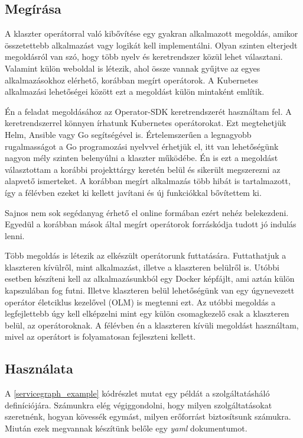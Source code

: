\subsection{Megírása}
A klaszter operátorral való kibővítése egy gyakran alkalmazott megoldás, amikor összetettebb alkalmazást vagy logikát kell implementálni. Olyan szinten elterjedt megoldásról van szó, hogy több nyelv és keretrendszer közül lehet választani. Valamint külön weboldal is létezik, ahol össze vannak gyűjtve az egyes alkalmazásokhoz elérhető, korábban megírt operátorok.\citep{operatorhub} A Kubernetes alkalmazási lehetőségei között ezt a megoldást külön mintaként említik.\citep{KubernetesPatterns} 

Én a feladat megoldásához az Operator-SDK\citep{operatorSDK} keretrendszerét használtam fel. A keretrendszerrel könnyen írhatunk Kubernetes operátorokat. Ezt megtehetjük Helm, Ansible vagy Go segítségével is. Értelemszerűen a legnagyobb rugalmasságot a Go programozási nyelvvel érhetjük el, itt van lehetőségünk nagyon mély szinten belenyúlni a klaszter működébe. Én is ezt a megoldást választottam a korábbi projekttárgy keretén belül és sikerült megszerezni az alapvető ismerteket. A korábban megírt alkalmazás több hibát is tartalmazott, így a félévben ezeket ki kellett javítani és új funkciókkal bővítettem ki. 

Sajnos nem sok segédanyag érhető el online formában ezért nehéz belekezdeni. Egyedül a korábban mások által megírt operátorok forráskódja tudott jó indulás lenni.

Több megoldás is létezik az elkészült operátorunk futtatására. Futtathatjuk a klaszteren kívülről, mint alkalmazást, illetve a klaszteren belülről is. Utóbbi esetben készíteni kell az alkalmazásunkból egy Docker képfájlt, ami aztán külön kapszulában fog futni. Illetve klaszteren belül lehetőségünk van egy úgynevezett operátor életciklus kezelővel (OLM) is megtenni ezt. Az utóbbi megoldás a legfejlettebb úgy kell elképzelni mint egy külön csomagkezelő csak a klaszteren belül, az operátoroknak. A félévben én a klaszteren kívüli megoldást használtam, mivel az operátort is folyamatosan fejleszteni kellett. 

\subsection{Használata}
A \ref{servicegraph_example} kódrészlet mutat egy példát a szolgáltatásháló definíciójára. Számunkra elég végiggondolni, hogy milyen szolgáltatásokat szeretnénk, hogyan kövessék egymást, milyen erőforrást biztosítsunk számukra. Miután ezek megvannak készítünk belőle egy \textit{yaml} dokumentumot.

